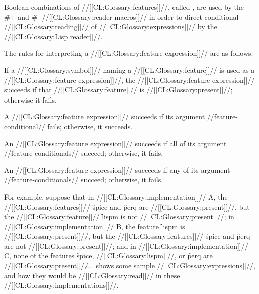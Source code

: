 Boolean combinations of //[[CL:Glossary:features]]//, called ,
are used by the \f{\#+} and \f{\#-} //[[CL:Glossary:reader macros]]// in order to
direct conditional //[[CL:Glossary:reading]]// of //[[CL:Glossary:expressions]]// by the //[[CL:Glossary:Lisp reader]]//.

The rules for interpreting a //[[CL:Glossary:feature expression]]// are as follows:

\beginlist


If a //[[CL:Glossary:symbol]]// naming a //[[CL:Glossary:feature]]// is used as a //[[CL:Glossary:feature expression]]//,
the //[[CL:Glossary:feature expression]]// succeeds if that //[[CL:Glossary:feature]]// is //[[CL:Glossary:present]]//;
otherwise it fails.


A  //[[CL:Glossary:feature expression]]// succeeds 
if its argument //feature-conditional// fails;
otherwise, it succeeds.


An  //[[CL:Glossary:feature expression]]// succeeds 
if all of its argument //feature-conditionals// succeed;
otherwise, it fails.


An  //[[CL:Glossary:feature expression]]// succeeds 
if any of its argument //feature-conditionals// succeed;
otherwise, it fails.

\endlist


For example, suppose that
 in //[[CL:Glossary:implementation]]// A, the //[[CL:Glossary:features]]// \f{spice} and \f{perq} are //[[CL:Glossary:present]]//,
			     but the //[[CL:Glossary:feature]]// \f{lispm} is not //[[CL:Glossary:present]]//;
 in //[[CL:Glossary:implementation]]// B, the feature \f{lispm} is //[[CL:Glossary:present]]//,
			     but the //[[CL:Glossary:features]]// \f{spice} and \f{perq} are
			      not //[[CL:Glossary:present]]//;
 and 
 in //[[CL:Glossary:implementation]]// C, none of the features \f{spice}, //[[CL:Glossary:lispm]]//, or \f{perq} are
			     //[[CL:Glossary:present]]//.
\Thenextfigure\ shows some sample //[[CL:Glossary:expressions]]//, and how they would be 
//[[CL:Glossary:read]]// in these //[[CL:Glossary:implementations]]//.

